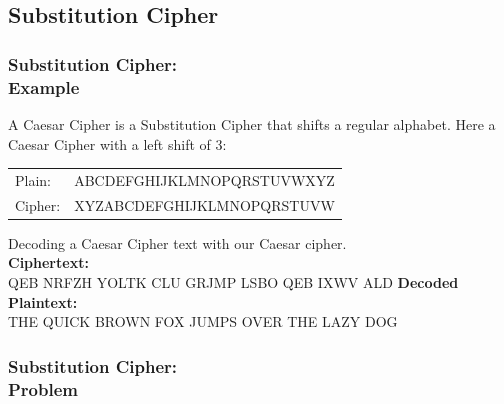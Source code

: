 \documentclass{uva-inf-presentation}
\begin{document}
\subsection{Substitution Cipher}
\frame{\tableofcontents[currentsubsection]}

\begin{frame}
\frametitle{Substitution Cipher:\\ Example}
A Caesar Cipher is a Substitution Cipher that shifts a regular alphabet.
Here a Caesar Cipher with a left shift of 3:\\
\begin{table}
    \begin{tabular}{lc}
        Plain:  & ABCDEFGHIJKLMNOPQRSTUVWXYZ\\
        Cipher: & XYZABCDEFGHIJKLMNOPQRSTUVW
    \end{tabular}
\end{table}

Decoding a Caesar Cipher text with our Caesar cipher.\\
\textbf{Ciphertext:}\\
\hspace{4ex}QEB NRFZH YOLTK CLU GRJMP LSBO QEB IXWV ALD
\textbf{Decoded Plaintext:}\\
\hspace{4ex}THE QUICK BROWN FOX JUMPS OVER THE LAZY DOG
\end{frame}

\begin{frame}
\frametitle{Substitution Cipher:\\ Problem}
\vspace{-20pt}


\end{frame}
\end{document}
